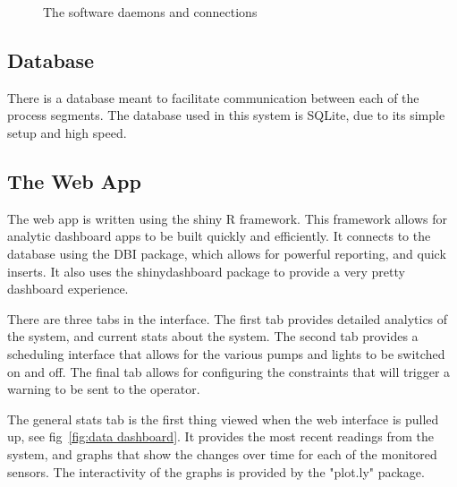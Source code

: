 \documentclass[american,12pt]{article}
\begin{document}
\begin{figure}[h]
    \centering
    \caption{The software daemons and connections}
    \label{fig:Software Architecture}
\end{figure}

\subsection{Database}
There is a database meant to facilitate communication between each of the 
process segments. The database used in this system is SQLite, due to its
simple setup and high speed. 

\subsection{The Web App}
The web app is written using the shiny R framework. This framework allows for 
analytic dashboard apps to be built quickly and efficiently. It connects to
the database using the DBI package, which allows for powerful reporting, and
quick inserts. It also uses the shinydashboard package to provide a very
pretty dashboard experience.

There are three tabs in the interface. The first tab provides detailed
analytics of the system, and current stats about the system. The second
tab provides a scheduling interface that allows for the various pumps
and lights to be switched on and off. The final tab allows for 
configuring the constraints that will trigger a warning to be sent to
the operator.

The general stats tab is the first thing viewed when the web interface is
pulled up, see fig~\ref{fig:data dashboard}. It provides the most recent 
readings from the system, and
graphs that show the changes over time for each of the monitored sensors.
The interactivity of the graphs is provided by the "plot.ly" package.
\end{document}

